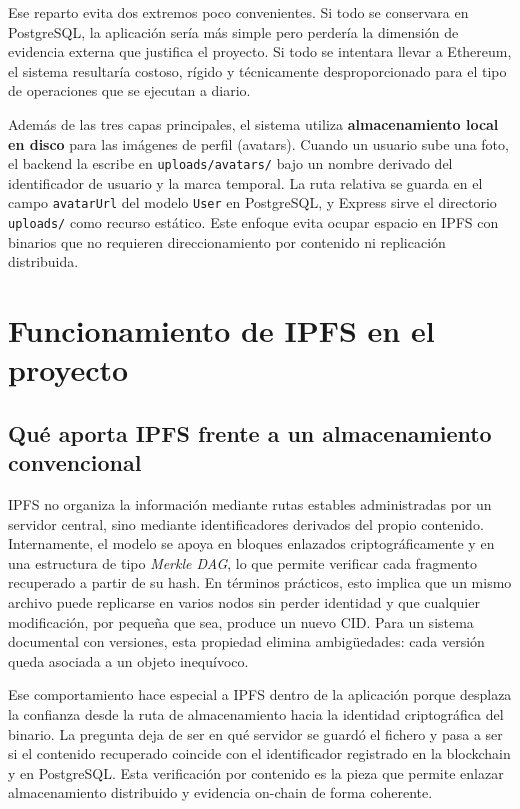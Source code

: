 \documentclass[11pt, a4paper]{article}
\begin{document}
Ese reparto evita dos extremos poco convenientes. Si todo se conservara en PostgreSQL, la aplicación sería más simple pero perdería la dimensión de evidencia externa que justifica el proyecto. Si todo se intentara llevar a Ethereum, el sistema resultaría costoso, rígido y técnicamente desproporcionado para el tipo de operaciones que se ejecutan a diario.

Además de las tres capas principales, el sistema utiliza \textbf{almacenamiento local en disco} para las imágenes de perfil (avatars). Cuando un usuario sube una foto, el backend la escribe en \texttt{uploads/avatars/} bajo un nombre derivado del identificador de usuario y la marca temporal. La ruta relativa se guarda en el campo \texttt{avatarUrl} del modelo \texttt{User} en PostgreSQL, y Express sirve el directorio \texttt{uploads/} como recurso estático. Este enfoque evita ocupar espacio en IPFS con binarios que no requieren direccionamiento por contenido ni replicación distribuida.

\section{Funcionamiento de IPFS en el proyecto}

\subsection{Qué aporta IPFS frente a un almacenamiento convencional}

IPFS no organiza la información mediante rutas estables administradas por un servidor central, sino mediante identificadores derivados del propio contenido. Internamente, el modelo se apoya en bloques enlazados criptográficamente y en una estructura de tipo \textit{Merkle DAG}, lo que permite verificar cada fragmento recuperado a partir de su hash. En términos prácticos, esto implica que un mismo archivo puede replicarse en varios nodos sin perder identidad y que cualquier modificación, por pequeña que sea, produce un nuevo CID. Para un sistema documental con versiones, esta propiedad elimina ambigüedades: cada versión queda asociada a un objeto inequívoco.

Ese comportamiento hace especial a IPFS dentro de la aplicación porque desplaza la confianza desde la ruta de almacenamiento hacia la identidad criptográfica del binario. La pregunta deja de ser en qué servidor se guardó el fichero y pasa a ser si el contenido recuperado coincide con el identificador registrado en la blockchain y en PostgreSQL. Esta verificación por contenido es la pieza que permite enlazar almacenamiento distribuido y evidencia on-chain de forma coherente.
\end{document}
